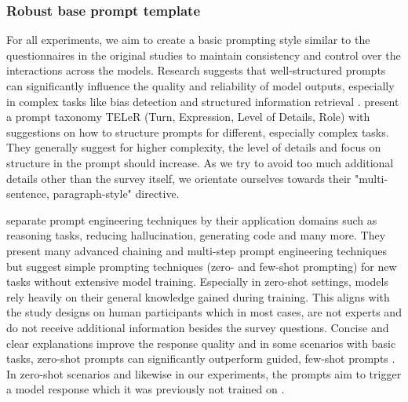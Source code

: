 \newpage
\subsubsection{Robust base prompt template}
\par For all experiments, we aim to create a basic prompting style similar to the questionnaires in the original studies to maintain consistency and control over the interactions across the models. Research suggests that well-structured prompts can significantly influence the quality and reliability of model outputs, especially in complex tasks like bias detection and structured information retrieval \parencite{chen2023unleashing,santu2023teler}. \textcite{santu2023teler} present a prompt taxonomy TELeR (Turn, Expression, Level of Details, Role) with suggestions on how to structure prompts for different, especially complex tasks. They generally suggest for higher complexity, the level of details and focus on structure in the prompt should increase. As we try to avoid too much additional details other than the survey itself, we orientate ourselves towards their "multi-sentence, paragraph-style" directive.

\par \textcite{sahoo2024systematic} separate prompt engineering techniques by their application domains such as reasoning tasks, reducing hallucination, generating code and many more. They present many advanced chaining and multi-step prompt engineering techniques but suggest simple prompting techniques (zero- and few-shot prompting) for new tasks without extensive model training. Especially in zero-shot settings, models rely heavily on their general knowledge gained during training. This aligns with the study designs on human participants which in most cases, are not experts and do not receive additional information besides the survey questions. Concise and clear explanations improve the response quality and in some scenarios with basic tasks, zero-shot prompts can significantly outperform guided, few-shot prompts \parencite{chen2023unleashing,ekin2023prompt}. In zero-shot scenarios and likewise in our experiments, the prompts aim to trigger a model response which it was previously not trained on \parencite{marvin2023prompt}.

